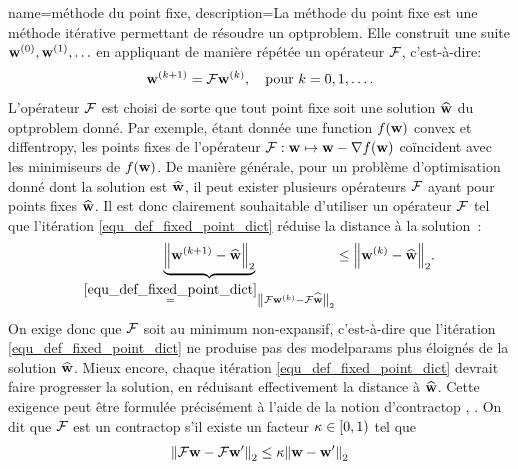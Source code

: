 {name={méthode du point fixe},
	description={La  méthode du point fixe est une méthode itérative 
		permettant de résoudre un \gls{optproblem}. Elle construit une suite \( {\bf w}^{(0)}, {\bf w}^{(1)}, \ldots \) 
		en appliquant de manière répétée un opérateur \( \mathcal{F} \), c’est-à-dire:
		\begin{equation} 
			\label{equ_def_fixed_point_dict} 
			{\bf w}^{(k+1)} = \mathcal{F} {\bf w}^{(k)}, \quad \text{pour } k = 0, 1, \ldots.
		\end{equation} 
		L’opérateur \( \mathcal{F} \) est choisi de sorte que tout point fixe soit une solution 
		\( \widehat{{\bf w}} \) du \gls{optproblem} donné. Par exemple, étant donnée une \gls{function} \( f({\bf w}) \) \gls{convex} et 
		\gls{diffentropy}, les points fixes de l’opérateur 
		\( \mathcal{F}: {\bf w} \mapsto {\bf w} - \nabla f({\bf w}) \) coïncident avec les minimiseurs de \( f({\bf w}) \).
		De manière générale, pour un problème d’optimisation donné dont la solution est \( \widehat{{\bf w}} \), 
		il peut exister plusieurs opérateurs \( \mathcal{F} \) ayant pour points fixes \( \widehat{{\bf w}} \). 
		Il est donc clairement souhaitable d’utiliser un opérateur \( \mathcal{F} \) tel que l’itération 
		\eqref{equ_def_fixed_point_dict} réduise la distance à la solution :
		\begin{equation}
			\nonumber
			\underbrace{\normgeneric{ \weights^{(\iteridx+1)} - \widehat{\netparams}}{2}}_{\stackrel{\eqref{equ_def_fixed_point_dict}}{=} 
				\normgeneric{ \fixedpointop \weights^{(\iteridx)} - \fixedpointop\widehat{\weights}}{2}}  \leq 
			\normgeneric{ \weights^{(\iteridx)} - \widehat{\weights}}{2}.
		\end{equation}
		On exige donc que \( \mathcal{F} \) soit au minimum non-expansif, c’est-à-dire que l’itération 
		\eqref{equ_def_fixed_point_dict} ne produise pas des \glspl{modelparam} plus éloignés de la solution 
		\( \widehat{{\bf w}} \).
		Mieux encore, chaque itération \eqref{equ_def_fixed_point_dict} devrait faire progresser la solution, 
		en réduisant effectivement la distance à \( \widehat{{\bf w}} \). Cette exigence peut être formulée 
		précisément à l’aide de la notion d’\gls{contractop} \cite{Bauschke:2017}, \cite{fixedpoinIsta}. 
		On dit que \( \mathcal{F} \) est un \gls{contractop} s’il existe un facteur \( \kappa \in [0,1) \) tel que
		\begin{equation}
			\nonumber
			\normgeneric{ \fixedpointop \weights - \fixedpointop \weights'}{2}  \leq  \contractfac \normgeneric{\weights - \weights'}{2} 

\end{equation}}}
